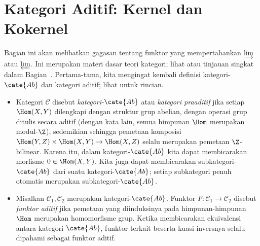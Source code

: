 
\section{Kategori Aditif: Kernel dan Kokernel}\label{sec:Ker-Coker}
\hypertarget{o014.aljabr2.chapter1.additive-categories-kernels-cokernels}{ }

Bagian ini akan melibatkan gagasan tentang funktor yang mempertahankan
$\varinjlim$ atau $\varprojlim$. Ini merupakan materi dasar teori kategori;
lihat \cite[Definisi 2.8.8]{Li1} atau tinjauan singkat dalam
Bagian~. Pertama-tama, kita mengingat kembali definisi
kategori-$\cate{Ab}$ dan kategori aditif; lihat \cite[\S 3.4]{Li1} untuk
rincian.

\begin{itemize}
	\item Kategori $\mathcal{C}$ disebut \emph{kategori-$\cate{Ab}$} atau
	\emph{kategori praaditif} jika setiap $\Hom(X,Y)$ dilengkapi dengan
	struktur grup abelian, dengan operasi grup ditulis secara aditif (dengan
	kata lain, semua himpunan $\Hom$ merupakan modul-$\Z$), sedemikian sehingga
	pemetaan komposisi
	$\Hom(Y,Z) \times \Hom(X,Y) \to \Hom(X,Z)$ selalu merupakan pemetaan
	$\Z$-bilinear. Karena itu, dalam kategori-$\cate{Ab}$ kita dapat
	membicarakan morfisme $0 \in \Hom(X,Y)$. Kita juga dapat membicarakan
	subkategori-$\cate{Ab}$ dari suatu kategori-$\cate{Ab}$; setiap subkategori
	penuh otomatis merupakan subkategori-$\cate{Ab}$.

	\item Misalkan $\mathcal{C}_1, \mathcal{C}_2$ merupakan
	kategori-$\cate{Ab}$. Funktor $F: \mathcal{C}_1 \to \mathcal{C}_2$ disebut
	\emph{funktor aditif} jika pemetaan yang diinduksinya pada himpunan-himpunan
	$\Hom$ merupakan homomorfisme grup. Ketika membicarakan ekuivalensi antara
	kategori-$\cate{Ab}$, funktor terkait beserta kuasi-inversnya selalu dipahami
	sebagai funktor aditif.
\end{itemize}

